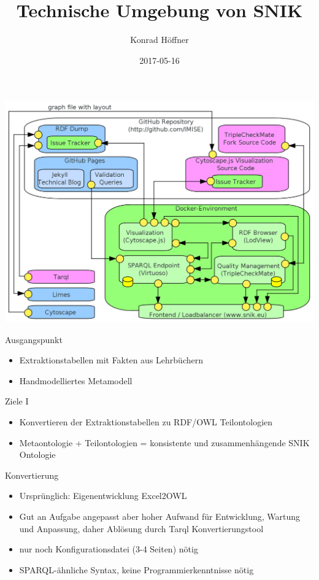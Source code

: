 \documentclass{beamer}
\author{Konrad Höffner}
\date{2017-05-16}
\title{Technische Umgebung von SNIK}
\institute{IMISE Institutskolloquium}
\begin{document}
\begin{frame}
\titlepage
\end{frame}

\begin{frame}
\includegraphics[width=\textwidth]{img/architecture.png}
\end{frame}

\begin{frame}{Ausgangspunkt}
\begin{itemize}
\item Extraktionstabellen mit Fakten aus Lehrbüchern 
\item Handmodelliertes Metamodell
\end{itemize}
\end{frame}

\begin{frame}{Ziele I}
\begin{itemize}
\item Konvertieren der Extraktionstabellen zu RDF/OWL Teilontologien 
\item Metaontologie + Teilontologien = konsistente und zusammenhängende SNIK Ontologie 
\end{itemize}
\end{frame}

\begin{frame}{Konvertierung}
\begin{itemize}
\item Ursprünglich: Eigenentwicklung Excel2OWL 
\item Gut an Aufgabe angepasst aber hoher Aufwand für Entwicklung, Wartung und Anpassung, daher Ablösung durch Tarql Konvertierungstool
\item nur noch Konfigurationsdatei (3-4 Seiten) nötig
\item SPARQL-ähnliche Syntax, keine Programmierkenntnisse nötig
\end{itemize}
\end{frame}
\end{document}
